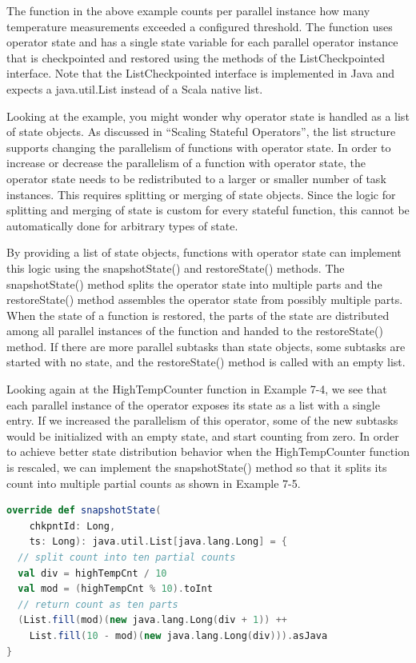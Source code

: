 \documentclass[oneside]{ctexbook}
\begin{document}
The function in the above example counts per parallel instance how many temperature measurements exceeded a configured threshold. The function uses operator state and has a single state variable for each parallel operator instance that is checkpointed and restored using the methods of the ListCheckpointed interface. Note that the ListCheckpointed interface is implemented in Java and expects a java.util.List instead of a Scala native list.

Looking at the example, you might wonder why operator state is handled as a list of state objects. As discussed in “Scaling Stateful Operators”, the list structure supports changing the parallelism of functions with operator state. In order to increase or decrease the parallelism of a function with operator state, the operator state needs to be redistributed to a larger or smaller number of task instances. This requires splitting or merging of state objects. Since the logic for splitting and merging of state is custom for every stateful function, this cannot be automatically done for arbitrary types of state.

By providing a list of state objects, functions with operator state can implement this logic using the snapshotState() and restoreState() methods. The snapshotState() method splits the operator state into multiple parts and the restoreState() method assembles the operator state from possibly multiple parts. When the state of a function is restored, the parts of the state are distributed among all parallel instances of the function and handed to the restoreState() method. If there are more parallel subtasks than state objects, some subtasks are started with no state, and the restoreState() method is called with an empty list.

Looking again at the HighTempCounter function in Example 7-4, we see that each parallel instance of the operator exposes its state as a list with a single entry. If we increased the parallelism of this operator, some of the new subtasks would be initialized with an empty state, and start counting from zero. In order to achieve better state distribution behavior when the HighTempCounter function is rescaled, we can implement the snapshotState() method so that it splits its count into multiple partial counts as shown in Example 7-5.

\begin{lstlisting}[language=scala]
override def snapshotState(
    chkpntId: Long, 
    ts: Long): java.util.List[java.lang.Long] = {
  // split count into ten partial counts
  val div = highTempCnt / 10
  val mod = (highTempCnt % 10).toInt
  // return count as ten parts
  (List.fill(mod)(new java.lang.Long(div + 1)) ++
    List.fill(10 - mod)(new java.lang.Long(div))).asJava
}
\end{lstlisting}
\end{document}
